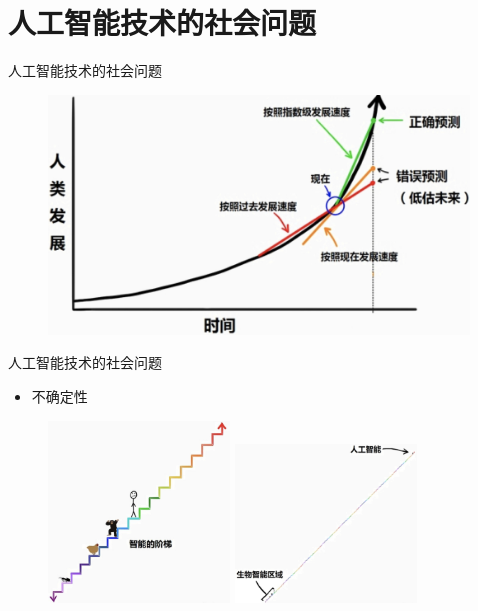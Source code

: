\documentclass{beamer}
\begin{document}
\section{人工智能技术的社会问题}
  \begin{frame}{人工智能技术的社会问题}
   \begin{figure}[H]
   \centering
   \includegraphics[height=2.5in]{zsjPic1.jpg}
   \end{figure}
  \end{frame} 

\begin{frame}{人工智能技术的社会问题}
  \begin{itemize}
   \item 不确定性
  \end{itemize}

  \begin{figure}[H]
   \centering
   \includegraphics[width=1.9in]{zsjPic2.jpg}
   \hspace*{0.3in}
   \includegraphics[width=1.9in]{zsjPic3.jpg}
   \end{figure}

\end{frame} 
\end{document}
